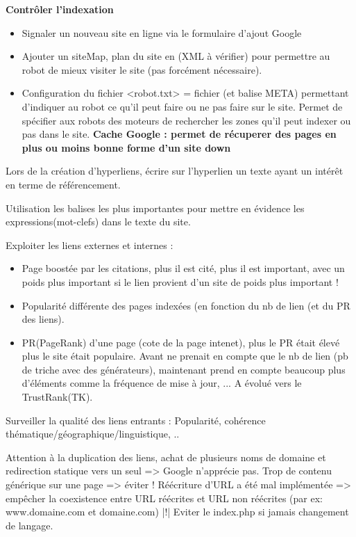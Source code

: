 \documentclass[10pt,a4paper]{article}
\begin{document}
\textbf{Contrôler l'indexation}
\begin{itemize}
\item Signaler un nouveau site en ligne via le formulaire d'ajout Google
\item Ajouter un siteMap, plan du site en (XML à vérifier) pour permettre au robot de mieux visiter le site (pas forcément nécessaire). 
\item Configuration du fichier <robot.txt> = fichier (et balise META) permettant d'indiquer au robot ce qu'il peut faire ou ne pas faire sur le site. Permet de spécifier aux robots des moteurs de rechercher les zones qu'il peut indexer ou pas dans le site. 
\textbf{Cache Google : permet de récuperer des pages en plus ou moins bonne forme d'un site down}
\end{itemize}

Lors de la création d'hyperliens, écrire sur l'hyperlien un texte ayant un intérêt en terme de référencement. 

Utilisation les balises les plus importantes pour mettre en évidence les expressions(mot-clefs) dans le texte du site. 

Exploiter les liens externes et internes : 
\begin{itemize}
\item Page boostée par les citations, plus il est cité, plus il est important, avec un poids plus important si le lien provient d'un site de poids plus important !
\item Popularité différente des pages indexées (en fonction du nb de lien (et du PR des liens).
\item PR(PageRank) d'une page (cote de la page intenet), plus le PR était élevé plus le site était populaire. Avant ne prenait en compte que le nb de lien (pb de triche avec des générateurs), maintenant prend en compte beaucoup plus d'éléments comme la fréquence de mise à jour, ... A évolué vers le TrustRank(TK).
\end{itemize}
Surveiller la qualité des liens entrants :
Popularité, cohérence thématique/géographique/linguistique, ..

Attention à la duplication des liens, achat de plusieurs noms de domaine et redirection statique vers un seul => Google n'apprécie pas. Trop de contenu générique sur une page => éviter !
Réécriture d'URL a été mal implémentée => empêcher la coexistence entre URL réécrites et URL non réécrites (par ex: www.domaine.com et domaine.com)
|!| Eviter le index.php si jamais changement de langage. 
\end{document}
